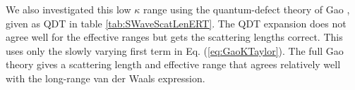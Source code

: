 \documentclass[preprint,showpacs,preprintnumbers,amsmath,amssymb]{revtex4}
\begin{document}
We also investigated this low $\kappa$ range using the quantum-defect theory of Gao \cite{Gao1998}, given as QDT in table \ref{tab:SWaveScatLenERT}. The QDT expansion does not agree well for the effective ranges but gets the scattering lengths correct. This uses only the slowly varying first term in Eq. (\ref{eq:GaoKTaylor}). The full Gao theory gives a scattering length and effective range that agrees relatively well with the long-range van der Waals expression.







\end{document}
